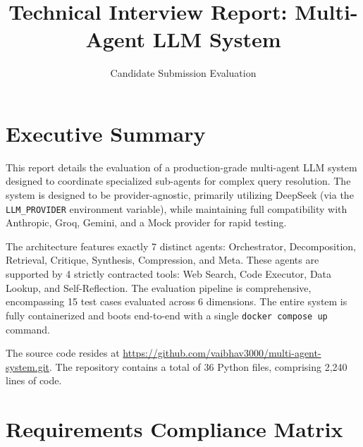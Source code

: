 \documentclass[11pt]{article}
\title{Technical Interview Report: Multi-Agent LLM System}
\author{Candidate Submission Evaluation}
\date{}
\begin{document}
\maketitle

\section{Executive Summary}
This report details the evaluation of a production-grade multi-agent LLM system designed to coordinate specialized sub-agents for complex query resolution. The system is designed to be provider-agnostic, primarily utilizing DeepSeek (via the \texttt{LLM\_PROVIDER} environment variable), while maintaining full compatibility with Anthropic, Groq, Gemini, and a Mock provider for rapid testing. 

The architecture features exactly 7 distinct agents: Orchestrator, Decomposition, Retrieval, Critique, Synthesis, Compression, and Meta. These agents are supported by 4 strictly contracted tools: Web Search, Code Executor, Data Lookup, and Self-Reflection. The evaluation pipeline is comprehensive, encompassing 15 test cases evaluated across 6 dimensions. The entire system is fully containerized and boots end-to-end with a single \texttt{docker compose up} command. 

The source code resides at \url{https://github.com/vaibhav3000/multi-agent-system.git}. The repository contains a total of 36 Python files, comprising 2,240 lines of code.

\section{Requirements Compliance Matrix}
\end{document}
